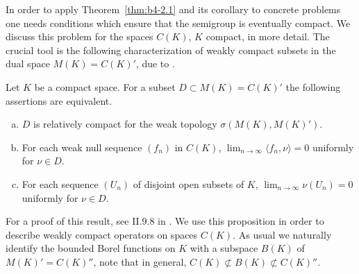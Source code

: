 In order to apply Theorem~\ref{thm:b4-2.1} and its corollary to concrete problems one
needs conditions which ensure that the semigroup is eventually compact.
We discuss this problem for the spaces $C(K)$, $K$ compact, in
more detail.
The crucial tool is the following characterization of
weakly compact subsets in the dual space $M(K) = C(K)'$, due to
\citet{grothendieck:1953}.

\begin{proposition}\label{prop:b4-2.3}
	Let $K$ be a compact space.
	For a subset $D \subset M(K) = C(K)'$ the following assertions are equivalent.
	
	\begin{enumerate}[(a)]
		\item 
		$D$ is relatively compact for the weak topology $\sigma(M(K),M(K)')$.
	
		\item 
		For each weak null sequence $(f_n)$ in $C(K)$, $\lim_{n\to\infty}\langle f_n,\nu \rangle = 0$ uniformly for $\nu \in D$.
	
		\item 
		For each sequence $(U_n)$ of disjoint open subsets of $K$, 
		$\lim_{n\to\infty}\nu(U_n) = 0$ uniformly for $\nu \in D$.
		\end{enumerate}
\end{proposition}
For a proof of this result, see \eg II.9.8 in \citet{schaefer:1974}.
We use this proposition in order to describe weakly compact operators on spaces $C(K)$.
As usual we naturally identify the bounded Borel functions on $K$ with a subspace $B(K)$ of $M(K)' = C(K)''$, note that in
general, $C(K) \not\subset B(K) \not\subset C(K)''$.

